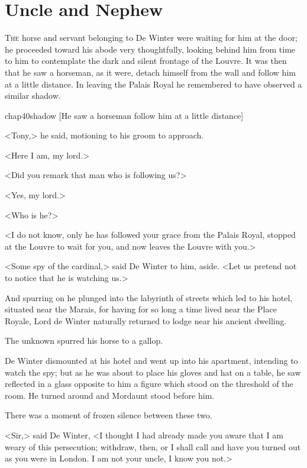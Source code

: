 \chapter{Uncle and Nephew}

 \lettrine{T}{he} horse and servant belonging to De Winter were waiting for him at the door; he proceeded toward his abode very thoughtfully, looking behind him from time to him to contemplate the dark and silent frontage of the Louvre. It was then that he saw a horseman, as it were, detach himself from the wall and follow him at a little distance. In leaving the Palais Royal he remembered to have observed a similar shadow.

\begin{bwbigpic}
	[\basicscale] 
	{chap40shadow}
	[He saw a horseman follow him at a little distance]
\end{bwbigpic}

<Tony,> he said, motioning to his groom to approach.

<Here I am, my lord.>

<Did you remark that man who is following us?>

<Yes, my lord.>

<Who is he?>

<I do not know, only he has followed your grace from the Palais Royal, stopped at the Louvre to wait for you, and now leaves the Louvre with you.>

<Some spy of the cardinal,> said De Winter to him, aside. <Let us pretend not to notice that he is watching us.>

And spurring on he plunged into the labyrinth of streets which led to his hotel, situated near the Marais, for having for so long a time lived near the Place Royale, Lord de Winter naturally returned to lodge near his ancient dwelling.

The unknown spurred his horse to a gallop.

De Winter dismounted at his hotel and went up into his apartment, intending to watch the spy; but as he was about to place his gloves and hat on a table, he saw reflected in a glass opposite to him a figure which stood on the threshold of the room. He turned around and Mordaunt stood before him.

There was a moment of frozen silence between these two.

<Sir,> said De Winter, <I thought I had already made you aware that I am weary of this persecution; withdraw, then, or I shall call and have you turned out as you were in London. I am not your uncle, I know you not.>

